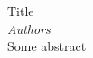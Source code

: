 \documentclass{book}
\newcommand{\RAbstract}[3]{%
#1 %
\\ {\small \textit{#2}}\\%
#3
 }
\begin{document}
\RAbstract{Title}{Authors}{Some abstract }
\end{document}
